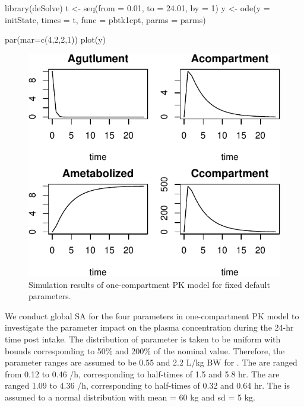 \begin{Schunk}
\begin{Sinput}
library(deSolve)
t <- seq(from = 0.01, to = 24.01, by = 1)
y <- ode(y = initState, times = t, func = pbtk1cpt, parms = parms)
\end{Sinput}
\end{Schunk}

\begin{Schunk}
\begin{Sinput}
par(mar=c(4,2,2,1))
plot(y)
\end{Sinput}
\begin{figure}

{\centering \includegraphics[width=0.6\linewidth]{RJ-pksensi_files/figure-latex/unnamed-chunk-5-1} 

}

\caption{\label{fig:ode-PK}Simulation results of one-compartment PK model for fixed default parameters.}\label{fig:unnamed-chunk-5}
\end{figure}
\end{Schunk}

We conduct global SA for the four parameters in one-compartment PK model
to investigate the parameter impact on the plasma concentration during
the 24-hr time post intake. The distribution of parameter is taken to be
uniform with bounds corresponding to 50\% and 200\% of the nominal
value. Therefore, the parameter ranges are assumed to be 0.55 and 2.2
L/kg BW for . The  are ranged from 0.12 to 0.46 /h,
corresponding to half-times of 1.5 and 5.8 hr. The  are ranged
1.09 to 4.36 /h, corresponding to half-times of 0.32 and 0.64 hr. The
 is assumed to a normal distribution with mean = 60 kg and sd =
5 kg.

\begin{Schunk}
\end{Schunk}

